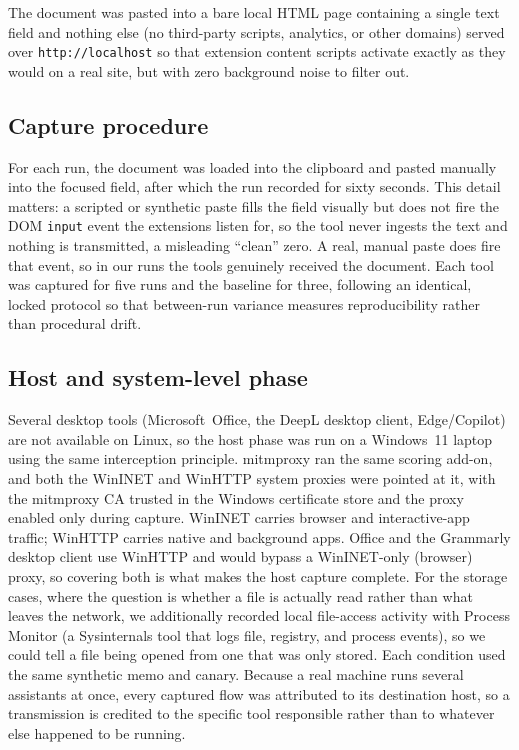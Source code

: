 \documentclass[10pt,conference,a4paper]{IEEEtran}
\begin{document}
The document was pasted into a bare local HTML page containing a single text field and
nothing else (no third-party scripts, analytics, or other domains) served over
\texttt{http://localhost} so that extension content scripts activate exactly as they
would on a real site, but with zero background noise to filter out.

\subsection{Capture procedure}

For each run, the document was loaded into the clipboard and pasted manually into the
focused field, after which the run recorded for sixty seconds. This detail matters: a
scripted or synthetic paste fills the field visually but does not fire the DOM
\texttt{input} event the extensions listen for, so the tool never ingests the text and
nothing is transmitted, a misleading ``clean'' zero. A real, manual paste does fire that
event, so in our runs the tools genuinely received the document. Each tool was captured for
five runs and the baseline for three, following an identical, locked
protocol so that between-run variance measures reproducibility rather than procedural
drift.

\subsection{Host and system-level phase}
Several desktop tools (Microsoft~Office, the DeepL desktop client, Edge/Copilot) are not
available on Linux, so the host phase was run on a Windows~11 laptop using the same
interception principle. mitmproxy ran the same scoring add-on, and both the WinINET and
WinHTTP system proxies were pointed at it, with the mitmproxy CA trusted in the Windows
certificate store and the proxy enabled only during capture. WinINET carries browser and
interactive-app traffic; WinHTTP carries native and background apps. Office and the Grammarly desktop
client use WinHTTP and would bypass a WinINET-only (browser) proxy, so covering both is
what makes the host capture complete. For the storage cases, where the question is whether
a file is actually read rather than what leaves the network, we additionally recorded local
file-access activity with Process Monitor (a Sysinternals tool that logs file, registry, and
process events), so we could tell a file being opened from one that was only stored. Each
condition used the same synthetic memo and canary. Because a real machine runs several
assistants at once, every captured flow was attributed to its destination host, so a
transmission is credited to the specific tool responsible rather than to whatever else
happened to be running.
\end{document}
